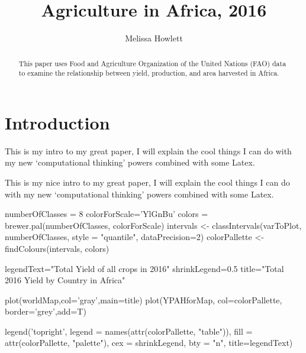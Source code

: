 \documentclass{article}
\title{Agriculture in Africa, 2016}
\author{Melissa Howlett}
\begin{document}

\maketitle

\begin{abstract}
This paper uses Food and Agriculture Organization of the United Nations (FAO) data to examine the relationship between yield, production, and area harvested in Africa. 
\end{abstract}

\section{Introduction}\label{intro}
This is my intro to my great paper, I will explain the cool things I can do with my new `computational thinking' powers combined with some Latex.

This is my nice intro to my great paper, 
I will explain the cool things I can do with my new `computational thinking' powers combined with some Latex.

numberOfClasses = 8
colorForScale='YlGnBu'
colors = brewer.pal(numberOfClasses, colorForScale)
intervals <- classIntervals(varToPlot, numberOfClasses, 
                            style = "quantile",
                            dataPrecision=2)
colorPallette <- findColours(intervals, colors)

legendText="Total Yield of all crops in 2016"
shrinkLegend=0.5
title="Total 2016 Yield by Country in Africa"

plot(worldMap,col='gray',main=title)
plot(YPAHforMap, col=colorPallette, border='grey',add=T)

legend('topright', legend = names(attr(colorPallette, "table")), 
       fill = attr(colorPallette, "palette"), cex = shrinkLegend, 
       bty = "n",
       title=legendText)
\end{document}
